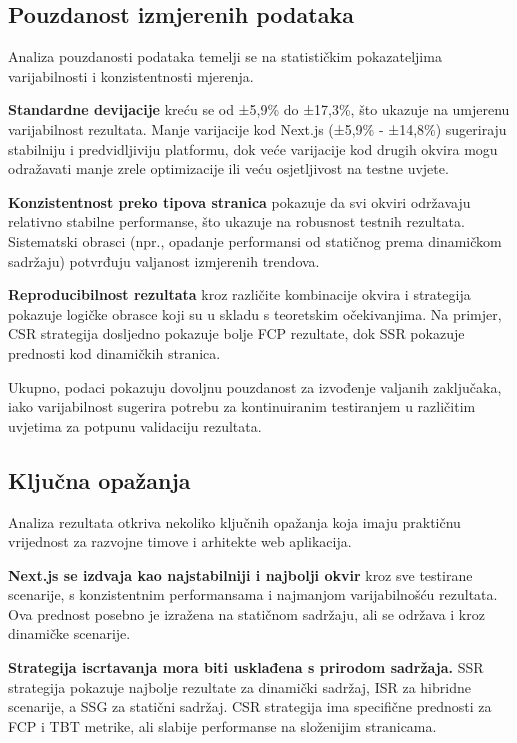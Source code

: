 \subsection{Pouzdanost izmjerenih podataka}

Analiza pouzdanosti podataka temelji se na statističkim pokazateljima varijabilnosti i konzistentnosti mjerenja.

\textbf{Standardne devijacije} kreću se od ±5,9\% do ±17,3\%, što ukazuje na umjerenu varijabilnost rezultata. Manje varijacije kod Next.js (±5,9\% - ±14,8\%) sugeriraju stabilniju i predvidljiviju platformu, dok veće varijacije kod drugih okvira mogu odražavati manje zrele optimizacije ili veću osjetljivost na testne uvjete.

\textbf{Konzistentnost preko tipova stranica} pokazuje da svi okviri održavaju relativno stabilne performanse, što ukazuje na robusnost testnih rezultata. Sistematski obrasci (npr., opadanje performansi od statičnog prema dinamičkom sadržaju) potvrđuju valjanost izmjerenih trendova.

\textbf{Reproducibilnost rezultata} kroz različite kombinacije okvira i strategija pokazuje logičke obrasce koji su u skladu s teoretskim očekivanjima. Na primjer, CSR strategija dosljedno pokazuje bolje FCP rezultate, dok SSR pokazuje prednosti kod dinamičkih stranica.

Ukupno, podaci pokazuju dovoljnu pouzdanost za izvođenje valjanih zaključaka, iako varijabilnost sugerira potrebu za kontinuiranim testiranjem u različitim uvjetima za potpunu validaciju rezultata.

\subsection{Ključna opažanja}

Analiza rezultata otkriva nekoliko ključnih opažanja koja imaju praktičnu vrijednost za razvojne timove i arhitekte web aplikacija.

\textbf{Next.js se izdvaja kao najstabilniji i najbolji okvir} kroz sve testirane scenarije, s konzistentnim performansama i najmanjom varijabilnošću rezultata. Ova prednost posebno je izražena na statičnom sadržaju, ali se održava i kroz dinamičke scenarije.

\textbf{Strategija iscrtavanja mora biti usklađena s prirodom sadržaja.} SSR strategija pokazuje najbolje rezultate za dinamički sadržaj, ISR za hibridne scenarije, a SSG za statični sadržaj. CSR strategija ima specifične prednosti za FCP i TBT metrike, ali slabije performanse na složenijim stranicama.

